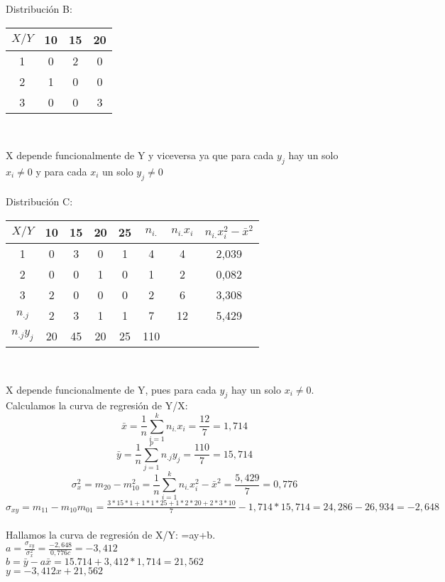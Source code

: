     Distribución B: 
    \begin{center}
    \begin{tabular}{| c | c | c | c |}
        \hline
        $X / Y$ & 10 & 15 & 20 \\ \hline
        1 & 0 & 2 & 0 \\ \hline
        2 & 1 & 0 & 0 \\ \hline
        3 & 0 & 0 & 3 \\ 
        \hline
    \end{tabular} \\ 
    \end{center}
    X depende funcionalmente de Y y viceversa ya que para cada $y_j$ hay un solo $x_i\neq 0$ y para cada $x_i$ un solo $y_j\neq 0$ \\ \\
    
    Distribución C:
    \begin{center}
    \begin{tabular}{| c | c | c | c | c | c | c | c |}
        \hline
        $X / Y$ & 10 & 15 & 20 & 25 & $n_{i.}$ & $n_{i.}x_i$ & $n_{i.}x_i^2-\bar{x}^2$\\ \hline
        1 & 0 & 3 & 0 & 1 & 4 & 4 & 2,039 \\ \hline
        2 & 0 & 0 & 1 & 0 & 1 & 2 & 0,082 \\ \hline
        3 & 2 & 0 & 0 & 0 & 2 & 6 & 3,308 \\ \hline
        $n_{.j}$ & 2 & 3 & 1 & 1 & 7 & 12 & 5,429 \\ \hline
        $n_{.j}y_j$ & 20 & 45 & 20 & 25 & 110 & & \\ 
        \hline
    \end{tabular} \\ 
    \end{center}
    X depende funcionalmente de Y, pues para cada $y_j$ hay un solo $x_i\neq 0$. 
    Calculamos la curva de regresión de Y/X: 
    \[\bar{x} = \frac{1}{n}\sum_{i=1}^{k}n_{i.}x_i = \frac{12}{7} = 1,714 \]
    \[\bar{y} = \frac{1}{n}\sum_{j=1}^{p}n_{.j}y_j = \frac{110}{7} = 15,714 \]
    \[\sigma_x^2 = m_{20}-m_{10}^2 = \frac{1}{n}\sum_{i=1}^{k}n_{i.}x_i^2-\bar{x}^2 = \frac{5,429}{7} = 0,776\]
    $\sigma_{xy} = m_{11}-m_{10}m_{01} = \frac{3*15*1+1*1*25+1*2*20+2*3*10}{7} - 1,714*15,714 = 24,286 - 26,934 = -2,648 $ \\ \\
    Hallamos la curva de regresión de X/Y: =ay+b. \\
    $a = \frac{\sigma_{xy}}{\sigma_x^2} = \frac{-2,648}{0,776c} = -3,412$ \\
    $b = \bar{y}-a\bar{x} = 15.714 +3,412*1,714 = 21,562$ \\
    $y=-3,412x + 21,562$ \\ \\ 
